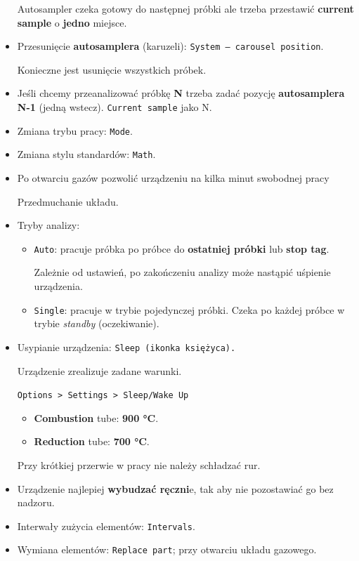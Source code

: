 \documentclass[
  letterpaper,
  DIV=11,
  numbers=noendperiod]{scrreprt}
\begin{document}
\begin{itemize}
  Autosampler czeka gotowy do następnej próbki ale trzeba przestawić
  \textbf{current sample} o \textbf{jedno} miejsce.
\item
  Przesunięcie \textbf{autosamplera} (karuzeli):
  \texttt{System\ –\ carousel\ position}.

  Konieczne jest usunięcie wszystkich próbek.
\item
  Jeśli chcemy przeanalizować próbkę \textbf{N} trzeba zadać pozycję
  \textbf{autosamplera} \textbf{N-1} (jedną wstecz).
  \texttt{Current\ sample} jako N.
\item
  Zmiana trybu pracy: \texttt{Mode}.
\item
  Zmiana stylu standardów: \texttt{Math}.
\item
  Po otwarciu gazów pozwolić urządzeniu na kilka minut swobodnej pracy

  Przedmuchanie układu.
\item
  Tryby analizy:

  \begin{itemize}
  \item
    \texttt{Auto}: pracuje próbka po próbce do \textbf{ostatniej próbki}
    lub \textbf{stop tag}.

    Zależnie od ustawień, po zakończeniu analizy może nastąpić uśpienie
    urządzenia.
  \item
    \texttt{Single}: pracuje w trybie pojedynczej próbki. Czeka po
    każdej próbce w trybie \emph{standby} (oczekiwanie).
  \end{itemize}
\item
  Usypianie urządzenia: \texttt{Sleep\ (ikonka\ księżyca).}

  Urządzenie zrealizuje zadane warunki.

  \texttt{Options\ \textgreater{}\ Settings\ \textgreater{}\ Sleep/Wake\ Up}

  \begin{itemize}
  \item
    \textbf{Combustion} tube: \textbf{900 °C}.
  \item
    \textbf{Reduction} tube: \textbf{700 °C}.
  \end{itemize}

  Przy krótkiej przerwie w pracy nie należy schładzać rur.
\item
  Urządzenie najlepiej \textbf{wybudzać ręczni}e, tak aby nie
  pozostawiać go bez nadzoru.
\item
  Interwały zużycia elementów: \texttt{Intervals}.
\item
  Wymiana elementów: \texttt{Replace\ part}; przy otwarciu układu
  gazowego.


\end{itemize}
\end{document}
